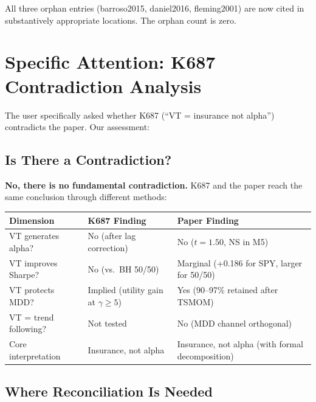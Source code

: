\documentclass[12pt,a4paper]{article}
\begin{document}
All three orphan entries (barroso2015, daniel2016, fleming2001) are now cited in substantively appropriate locations. The orphan count is zero.


\section{Specific Attention: K687 Contradiction Analysis}

The user specifically asked whether K687 (``VT = insurance not alpha'') contradicts the paper. Our assessment:

\subsection{Is There a Contradiction?}

\textbf{No, there is no fundamental contradiction.} K687 and the paper reach the same conclusion through different methods:

\begin{center}
\begin{tabular}{p{4cm}p{5cm}p{5cm}}
\toprule
Dimension & K687 Finding & Paper Finding \\
\midrule
VT generates alpha? & No (after lag correction) & No ($t = 1.50$, NS in M5) \\
VT improves Sharpe? & No (vs.\ BH 50/50) & Marginal (+0.186 for SPY, larger for 50/50) \\
VT protects MDD? & Implied (utility gain at $\gamma \geq 5$) & Yes (90--97\% retained after TSMOM) \\
VT = trend following? & Not tested & No (MDD channel orthogonal) \\
Core interpretation & Insurance, not alpha & Insurance, not alpha (with formal decomposition) \\
\bottomrule
\end{tabular}
\end{center}

\subsection{Where Reconciliation Is Needed}
\end{document}
